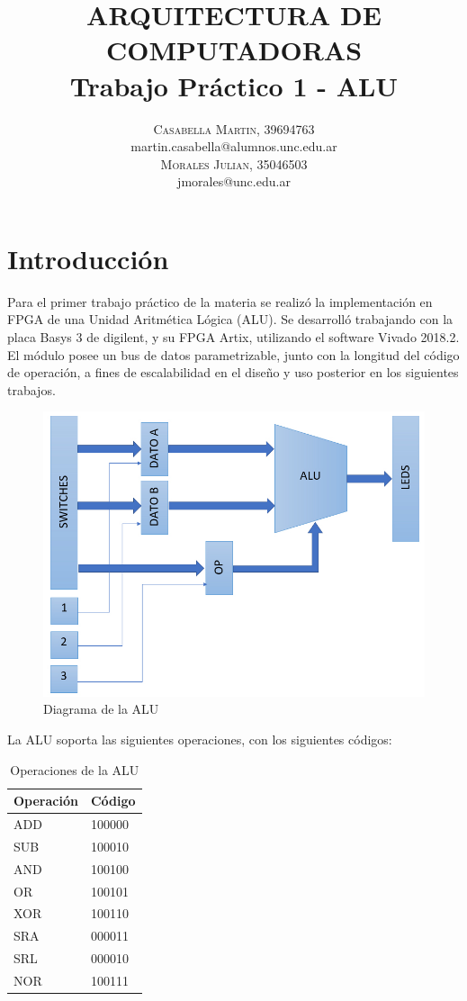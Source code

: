 \documentclass[paper=letter, fontsize=12pt]{article}
\title{\bigskip \bigskip \bigskip \bigskip \vspace{-15mm}\fontsize{24pt}{10pt}\selectfont\textbf{ARQUITECTURA DE COMPUTADORAS \\}
\bigskip \bigskip \fontsize{18pt}{10pt}\selectfont\textbf{Trabajo Práctico 1 - ALU}} %
\author{
\large
{\textsc{Casabella Martin, 39694763 }}\\[2mm]
\bigskip
  martin.casabella@alumnos.unc.edu.ar\\[2mm]
{\textsc{Morales Julian, 35046503 }}\\[2mm]
 jmorales@unc.edu.ar
}
\date{}
\begin{document}
\maketitle %
\thispagestyle{fancy} %

\bigskip
\bigskip

\section{\textbf{Introducción}} \label{intro}
Para el primer trabajo práctico de la materia se realizó la implementación en FPGA de una Unidad Aritmética Lógica (ALU). Se desarrolló trabajando con la placa Basys 3 de digilent, y su FPGA Artix, utilizando el software Vivado 2018.2. 
El módulo posee un bus de datos parametrizable, junto con la longitud del código de operación, a fines de escalabilidad en el diseño y uso posterior en los siguientes trabajos.

\bigskip
\bigskip
\bigskip

\begin{figure}[H]
\centering
\includegraphics[scale=0.9, width=.6\textwidth]{alu.jpg}
\caption{\label{fig:alu}Diagrama de la ALU}
\end{figure}

\bigskip
\bigskip

La ALU soporta las siguientes operaciones, con los siguientes códigos:
\begin{table}[H]
\centering
\begin{tabular}{@{}ll@{}}
\toprule
Operación & Código \\ \midrule
ADD       & 100000 \\
SUB       & 100010 \\
AND       & 100100 \\
OR        & 100101 \\
XOR       & 100110 \\
SRA       & 000011 \\
SRL       & 000010 \\
NOR       & 100111 \\ \bottomrule
\end{tabular}
\caption{Operaciones de la ALU}
\label{operaciones}
\end{table}
\end{document}
